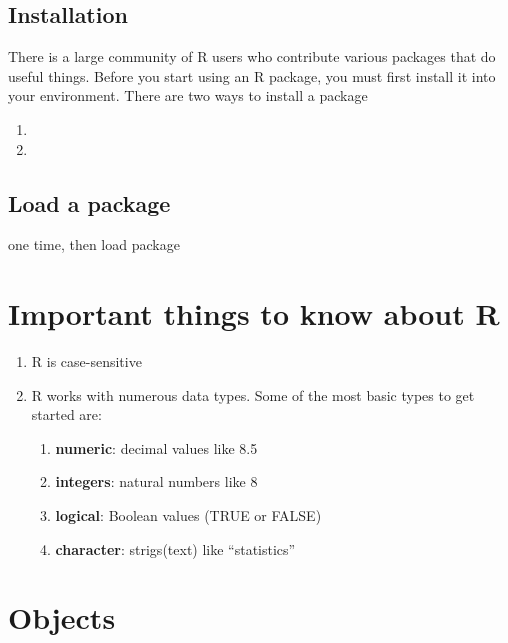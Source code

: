 \documentclass[
]{book}
\begin{document}
\hypertarget{installation}{%
\subsection{Installation}\label{installation}}

There is a large community of R users who contribute various packages that do useful things. Before you start using an R package, you must first install it into your environment. There are two ways to install a package

\begin{enumerate}
\def\labelenumi{\arabic{enumi}.}
\item
\item
\end{enumerate}

\hypertarget{load-a-package}{%
\subsection{Load a package}\label{load-a-package}}

one time, then load package

\hypertarget{important-things-to-know-about-r}{%
\section{Important things to know about R}\label{important-things-to-know-about-r}}

\begin{enumerate}
\def\labelenumi{\arabic{enumi}.}
\item
  R is case-sensitive
\item
  R works with numerous data types. Some of the most basic types to get started are:

  \begin{enumerate}
  \def\labelenumii{\roman{enumii}.}
  \item
    \textbf{numeric}: decimal values like 8.5
  \item
    \textbf{integers}: natural numbers like 8
  \item
    \textbf{logical}: Boolean values (TRUE or FALSE)
  \item
    \textbf{character}: strigs(text) like ``statistics''
  \end{enumerate}
\end{enumerate}

\hypertarget{objects}{%
\section{Objects}\label{objects}}
\end{document}
